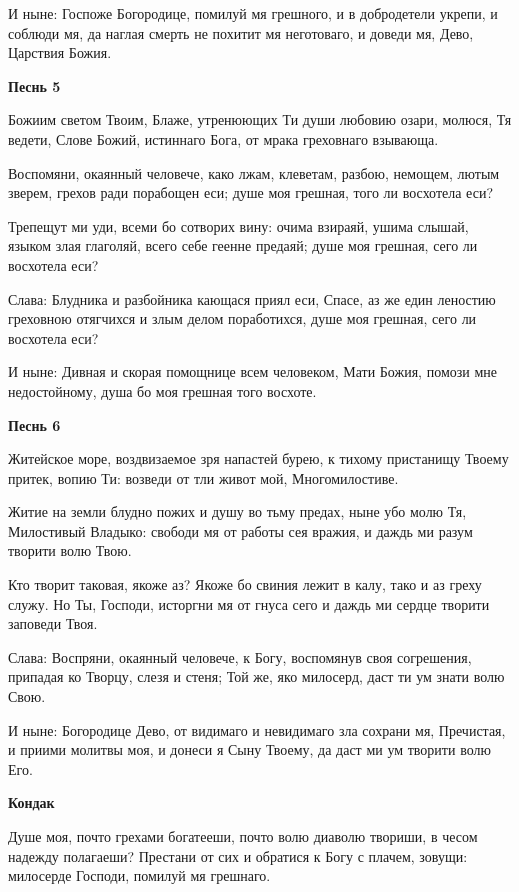 И ныне: Госпоже Богородице, помилуй мя грешного, и в добродетели укрепи, и соблюди мя, да наглая смерть не похитит мя неготоваго, и доведи мя, Дево, Царствия Божия.


\medskip
\bfseries Песнь 5\normalfont{}


Божиим светом Твоим, Блаже, утренюющих Ти души любовию озари, молюся, Тя ведети, Слове Божий, истиннаго Бога, от мрака греховнаго взывающа.


Воспомяни, окаянный человече, како лжам, клеветам, разбою, немощем, лютым зверем, грехов ради порабощен еси; душе моя грешная, того ли восхотела еси?


Трепещут ми уди, всеми бо сотворих вину: очима взираяй, ушима слышай, языком злая глаголяй, всего себе геенне предаяй; душе моя грешная, сего ли восхотела еси?


Слава: Блудника и разбойника кающася приял еси, Спасе, аз же един леностию греховною отягчихся и злым делом поработихся, душе моя грешная, сего ли восхотела еси?


И ныне: Дивная и скорая помощнице всем человеком, Мати Божия, помози мне недостойному, душа бо моя грешная того восхоте.


\medskip
\bfseries Песнь 6\normalfont{}


Житейское море, воздвизаемое зря напастей бурею, к тихому пристанищу Твоему притек, вопию Ти: возведи от тли живот мой, Многомилостиве.


Житие на земли блудно пожих и душу во тьму предах, ныне убо молю Тя, Милостивый Владыко: свободи мя от работы сея вражия, и даждь ми разум творити волю Твою.


Кто творит таковая, якоже аз? Якоже бо свиния лежит в калу, тако и аз греху служу. Но Ты, Господи, исторгни мя от гнуса сего и даждь ми сердце творити заповеди Твоя.


Слава: Воспряни, окаянный человече, к Богу, воспомянув своя согрешения, припадая ко Творцу, слезя и стеня; Той же, яко милосерд, даст ти ум знати волю Свою.


И ныне: Богородице Дево, от видимаго и невидимаго зла сохрани мя, Пречистая, и приими молитвы моя, и донеси я Сыну Твоему, да даст ми ум творити волю Его.


\medskip
\bfseries Кондак\normalfont{}


Душе моя, почто грехами богатееши, почто волю диаволю твориши, в чесом надежду полагаеши? Престани от сих и обратися к Богу с плачем, зовущи: милосерде Господи, помилуй мя грешнаго.


